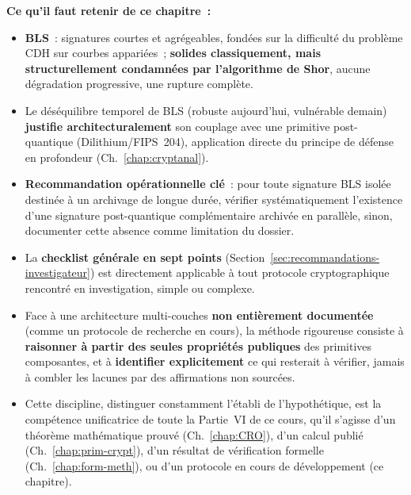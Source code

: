 \begin{boxresume}
\textbf{Ce qu'il faut retenir de ce chapitre~:}
\begin{itemize}
    \item \textbf{BLS}~: signatures courtes et agrégeables, fondées
          sur la difficulté du problème CDH sur courbes appariées~;
          \textbf{solides classiquement, mais structurellement
          condamnées par l'algorithme de Shor}, aucune
          dégradation progressive, une rupture complète.

    \item Le déséquilibre temporel de BLS (robuste aujourd'hui,
          vulnérable demain) \textbf{justifie architecturalement}
          son couplage avec une primitive post-quantique
          (Dilithium/FIPS~204), application directe du principe
          de défense en profondeur (Ch.~\ref{chap:cryptanal}).

    \item \textbf{Recommandation opérationnelle clé}~: pour toute
          signature BLS isolée destinée à un archivage de longue
          durée, vérifier systématiquement l'existence d'une
          signature post-quantique complémentaire archivée en
          parallèle, sinon, documenter cette absence comme
          limitation du dossier.

    \item La \textbf{checklist générale en sept points}
          (Section~\ref{sec:recommandations-investigateur}) est
          directement applicable à tout protocole cryptographique
          rencontré en investigation, simple ou complexe.

    \item Face à une architecture multi-couches \textbf{non
          entièrement documentée} (comme un protocole de recherche
          en cours), la méthode rigoureuse consiste à
          \textbf{raisonner à partir des seules propriétés
          publiques} des primitives composantes, et à
          \textbf{identifier explicitement} ce qui resterait à
          vérifier, jamais à combler les lacunes par des
          affirmations non sourcées.

    \item Cette discipline, distinguer constamment l'établi de
          l'hypothétique, est la compétence unificatrice de
          toute la Partie~VI de ce cours, qu'il s'agisse d'un
          théorème mathématique prouvé (Ch.~\ref{chap:CRO}), d'un
          calcul publié (Ch.~\ref{chap:prim-crypt}), d'un résultat
          de vérification formelle (Ch.~\ref{chap:form-meth}), ou
          d'un protocole en cours de développement (ce chapitre).
\end{itemize}
\end{boxresume}

